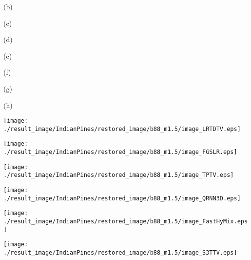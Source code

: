\begin{figure*}[t]
\begin{center}
		\begin{minipage}{0.125\hsize}
			\centerline{\small{(b)}}
		\end{minipage}
		\begin{minipage}{0.125\hsize}
			\centerline{\small{(c)}}
		\end{minipage}
		\begin{minipage}{0.125\hsize}
			\centerline{\small{(d)}}
		\end{minipage}
		\begin{minipage}{0.125\hsize}
			\centerline{\small{(e)}}
		\end{minipage}
        \begin{minipage}{0.125\hsize}
			\centerline{\small{(f)}}
		\end{minipage}
		\begin{minipage}{0.125\hsize}
			\centerline{\small{(g)}}
		\end{minipage}
        \begin{minipage}{0.125\hsize}
			\centerline{\small{(h)}}
		\end{minipage}
  
        \vspace{2mm}

        \begin{minipage}{0.125\hsize}
			\centerline{\hspace{\hsize}} %
		\end{minipage}
        \begin{minipage}{0.125\hsize}
            \centerline{\texttt{[image: ./result\_image/IndianPines/restored\_image/b88\_m1.5/image\_LRTDTV.eps]}} %
        \end{minipage}
        \begin{minipage}{0.125\hsize}
        	\centerline{\texttt{[image: ./result\_image/IndianPines/restored\_image/b88\_m1.5/image\_FGSLR.eps]}} %
        \end{minipage}
        \begin{minipage}{0.125\hsize}
            \centerline{\texttt{[image: ./result\_image/IndianPines/restored\_image/b88\_m1.5/image\_TPTV.eps]}} %
        \end{minipage}
        \begin{minipage}{0.125\hsize}
        	\centerline{\texttt{[image: ./result\_image/IndianPines/restored\_image/b88\_m1.5/image\_QRNN3D.eps]}} %
        \end{minipage}
        \begin{minipage}{0.125\hsize}
        	\centerline{\texttt{[image: ./result\_image/IndianPines/restored\_image/b88\_m1.5/image\_FastHyMix.eps]}} %
        \end{minipage}
        \begin{minipage}{0.125\hsize}
            \centerline{\texttt{[image: ./result\_image/IndianPines/restored\_image/b88\_m1.5/image\_S3TTV.eps]}} %
        \end{minipage}
        

\end{center}
\end{figure*}
